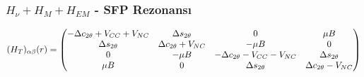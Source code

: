 \documentclass[10pt]{beamer}
\begin{document}
\begin{frame}[noframenumbering]
    \frametitle{$H_{\nu}+ H_{M}+ H_{EM}$ - SFP Rezonansı}
    \hrulefill
    
    \tiny
    \begin{equation*}
        (H_{T})_{\alpha\beta}(r) = \mqty(-\Delta c_{2\theta}+V_{CC}+V_{NC} & \Delta s_{2\theta} & 0 & \mu B\\\Delta s_{2\theta} & \Delta c_{2\theta} + V_{NC}& -\mu B & 0
        \\0 & -\mu B& -\Delta c_{2\theta}-V_{CC}-V_{NC} & \Delta s_{2\theta}\\ \mu B& 0 & \Delta s_{2\theta} & \Delta c_{2\theta}-V_{NC} )
    \end{equation*}
    \normalsize
    
    \hrulefill


\end{frame}
\end{document}
